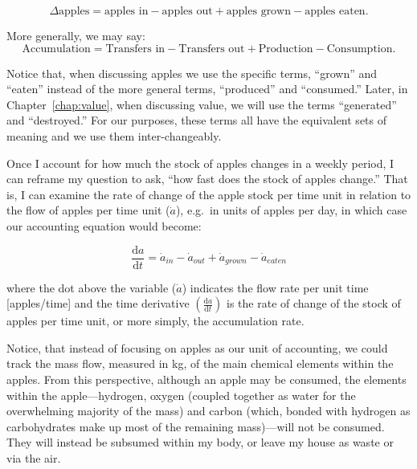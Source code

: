 \begin{equation}
	\Delta\textrm{apples} 
	= \textrm{apples in} 
	- \textrm{apples out} 
	+ \textrm{apples grown} 
	- \textrm{apples eaten}.
\end{equation}

\noindent{}More generally, we may say:
\begin{equation}
	\textrm{Accumulation}
	= \textrm{Transfers in} 
	- \textrm{Transfers out}
	+ \textrm{Production}
	- \textrm{Consumption}.
\end{equation}

Notice that, when discussing apples we use the specific terms, ``grown'' and
``eaten'' instead of the more general terms, ``produced'' and ``consumed.''
Later, in Chapter~\ref{chap:value}, when discussing value, we will use the terms
``generated'' and ``destroyed.'' For our purposes, these terms all have the equivalent
sets of meaning and we use them inter-changeably.

Once I account for how much the stock of apples changes in a weekly period,
I can reframe my question to ask, ``how fast does the stock of
apples change.'' That is, I can examine the rate of
change of the apple stock per time unit in relation to the flow of apples 
per time unit ($\dot{a}$), 
e.g.\ in units of apples per day, 
in which case our accounting equation would become:

\begin{equation} \label{eq:apple_rate_accounting}
	\frac{\mathrm{d}a}{\mathrm{d}t}
	= \dot{a}_{in}
	- \dot{a}_{out}
	+ \dot{a}_{grown}
	- \dot{a}_{eaten}
\end{equation}

\noindent{}where the dot above the variable ($\dot{a}$) indicates 
the flow rate per unit time [apples/time] and
the time derivative $\left( \frac{\mathrm{d}a}{\mathrm{d}t} \right)$ 
is the rate of change of the stock of apples per time unit, or more simply,
 the accumulation rate.
 

Notice, that instead of focusing on apples as our unit of accounting, we
could track the mass flow, measured in kg, of the main chemical elements
within the apples. From this perspective, although an apple may be consumed,
the elements within the apple---hydrogen, oxygen (coupled together as water
for the overwhelming majority of the mass) and carbon (which, bonded with
hydrogen as carbohydrates make up most of the remaining mass)---will not be
consumed. They will instead be subsumed within my body, or leave my house as
waste or via the air.

